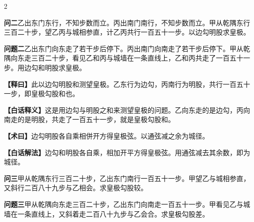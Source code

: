 \documentclass[11pt,a4paper]{article}
\newcommand{\WenQuestion}[1]{\textbf{\textcolor{classicalcolor}{#1}}}
\newcommand{\BaiQuestion}[1]{\textbf{\textcolor{moderncolor}{#1}}}
\newcommand{\WenExplain}{\textcolor{classicalcolor}{\textbf{【释曰】}}}
\newcommand{\BaiExplain}{\textcolor{moderncolor}{\textbf{【白话释义】}}}
\newcommand{\WenMethod}{\textcolor{classicalcolor}{\textbf{【术曰】}}}
\newcommand{\BaiMethod}{\textcolor{moderncolor}{\textbf{【白话解法】}}}
\begin{document}
\begin{paracol}{2}
\vspace{0.8em}

\switchcolumn*
\begin{tcolorbox}[colback=red!3,colframe=red!30!black,boxrule=0.3pt]
\WenQuestion{问二}\quad 乙出东门东行，不知步数而立。丙出南门南行，不知步数而立。甲从乾隅东行三百二十步，望乙丙与城相参直，计乙丙共行一百五十一步。以边勾明股求皇极。
\end{tcolorbox}
\switchcolumn
\begin{tcolorbox}[colback=blue!3,colframe=blue!30!black,boxrule=0.3pt]
\BaiQuestion{问题二}\quad 乙出东门向东走了若干步后停下。丙出南门向南走了若干步后停下。甲从乾隅向东走三百二十步，看见乙和丙与城墙在一条直线上，乙和丙共走了一百五十一步。用边勾和明股求皇极。
\end{tcolorbox}

\switchcolumn*
\begin{tcolorbox}[colback=red!5,colframe=red!30!black,boxrule=0.3pt]
\WenExplain\quad 此以边勾明股和测望皇极。乙东行为边勾，丙南行为明股，共行一百五十一步，即皇极勾股和也。
\end{tcolorbox}
\switchcolumn
\begin{tcolorbox}[colback=blue!5,colframe=blue!30!black,boxrule=0.3pt]
\BaiExplain\quad 这是用边勾与明股之和来测望皇极的问题。乙向东走的是边勾，丙向南走的是明股，共走了一百五十一步，就是皇极勾股和。
\end{tcolorbox}

\switchcolumn*
\begin{tcolorbox}[colback=red!5,colframe=red!40!black,boxrule=0.3pt]
\WenMethod\quad 边勾明股各自乘相併开方得皇极弦。以通弦减之余为城径。
\end{tcolorbox}
\switchcolumn
\begin{tcolorbox}[colback=blue!5,colframe=blue!40!black,boxrule=0.3pt]
\BaiMethod\quad 边勾和明股各自乘，相加开平方得皇极弦。用通弦减去其余数，即为城径。
\end{tcolorbox}

\vspace{0.8em}

\switchcolumn*
\begin{tcolorbox}[colback=red!3,colframe=red!30!black,boxrule=0.3pt]
\WenQuestion{问三}\quad 甲从乾隅东行三百二十步，乙出东门南行一百五十一步。甲望乙与城相参直，又斜行二百八十九步与乙相会。求皇极勾股较。
\end{tcolorbox}
\switchcolumn
\begin{tcolorbox}[colback=blue!3,colframe=blue!30!black,boxrule=0.3pt]
\BaiQuestion{问题三}\quad 甲从乾隅向东走三百二十步，乙出东门向南走一百五十一步。甲看见乙与城墙在一条直线上，又斜着走二百八十九步与乙会合。求皇极勾股差。
\end{tcolorbox}


\end{paracol}
\end{document}
